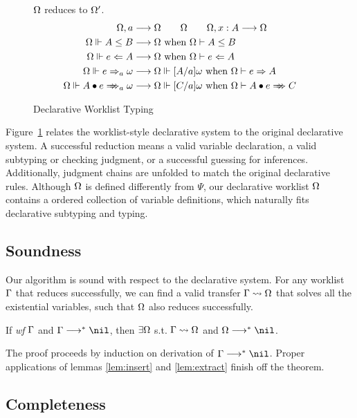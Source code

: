 \begin{figure}[t]
 $\Omega$ reduces to $\Omega'$.
\begin{gather*}
\begin{aligned}
\Om,a &\rto \Om \qquad \Om \qquad \Om,x:A \rto \Om\\
\Om\Vdash A\le B &\rto \Om \text{ when } \Om\vdash A\le B\\
\Om\Vdash e\Lto A &\rto \Om \text{ when } \Om\vdash e\Lto A\\
\Om\Vdash e\To_a \jg &\rto \Om\Vdash[A/a]\jg \text{ when } \Om\vdash e\To A\\
\Om\Vdash \appInfAlg{A}{e} &\rto \Om\Vdash[C/a]\jg \text{ when } \Om\vdash \appInf{A}{e}{C}\\
\end{aligned}
\end{gather*}
\caption{Declarative Worklist Typing}
\label{fig:decl:worklist}
\end{figure}

Figure~\ref{fig:decl:worklist} relates the worklist-style declarative system
to the original declarative system.
A successful reduction means a valid variable declaration,
a valid subtyping or checking judgment, or a successful guessing for inferences.
Additionally, judgment chains are unfolded to match the original declarative rules.
Although $\Omega$ is defined differently from $\Psi$,
our declarative worklist $\Omega$ contains a ordered collection of variable definitions,
which naturally fits declarative subtyping and typing.

\subsection{Soundness}

Our algorithm is sound with respect to the declarative system.
For any worklist $\Gamma$ that reduces successfully,
we can find a valid transfer $\Gamma\rightsquigarrow\Omega$ that solves all the existential variables,
such that $\Omega$ also reduces successfully.
\begin{theorem}[Soundness]
If \emph{wf }$\Gamma$ and $\Gm \redto \nil$, then $\exists \Omega$ s.t. $\Gamma\rightsquigarrow\Omega$ and $\Om\redto\nil$.
\end{theorem}

The proof proceeds by induction on derivation of $\Gm\redto\nil$.
Proper applications of lemmas \ref{lem:insert} and \ref{lem:extract} finish off the theorem.

\subsection{Completeness}

